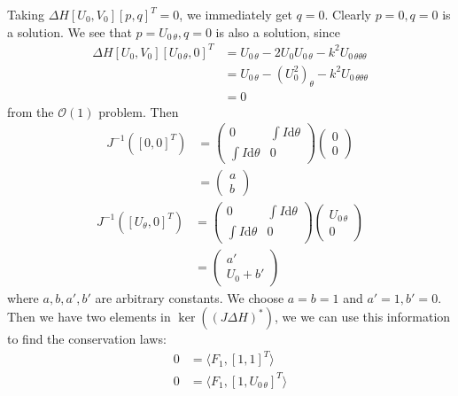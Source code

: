 \documentclass[12pt]{article}
\newcommand{\dd}[0]{\mathrm{d}}
\newcommand{\mc}[1]{\mathcal{#1}}
\numberwithin{equation}{section}
\begin{document}
Taking $\Delta H[U_0,V_0][p,q]^T = 0$, we immediately get $q = 0$. Clearly $p = 0, q = 0$ is a solution.  We see that $ p = U_{0\,\theta }, q = 0$ is also a solution, since
\begin{align}
    \Delta H[U_0,V_0][U_{0\, \theta},0]^T &= U_{0\, \theta} - 2U_0U_{0\,\theta} - k^2 U_{0\, \theta \theta \theta} \nonumber\\ 
    &= U_{0\, \theta} - \left(U_0^2\right)_{\theta} - k^2U_{0\, \theta \theta \theta} \nonumber \\
    &= 0
\end{align}
from the $\mc O(1)$ problem. Then 
\begin{align}
    J^{-1} \left([0,0]^T\right) &= \left(\begin{array}{cc}
        0 & \int I\dd \theta \\
        \int I\dd \theta & 0
    \end{array}\right) \left(\begin{array}{c}
         0  \\
         0
    \end{array}\right) \nonumber \\
    &= \left(\begin{array}{c}
         a  \\
         b 
    \end{array}\right)
\end{align}
\begin{align}
    J^{-1} \left([U_{\theta},0]^T\right) &= \left(\begin{array}{cc}
        0 & \int I\dd \theta \\
        \int I\dd \theta & 0
    \end{array}\right) \left(\begin{array}{c}
         U_{0\, \theta}  \\
         0
    \end{array}\right) \nonumber \\
    &= \left(\begin{array}{c}
         a' \\
         U_{0} + b' 
    \end{array}\right)
\end{align}
where $a, b, a',b'$ are arbitrary constants. We choose $a=b=1$ and $a' = 1, b' = 0$. Then we have two elements in $\ker((J\Delta H)^*)$, we we can use this information to find the conservation laws:
\begin{align*}
    0 &= \langle F_1,[1,1]^T \rangle\\
    0 &= \langle F_1,[1,U_{0\,\theta}]^T \rangle
\end{align*}
\end{document}

